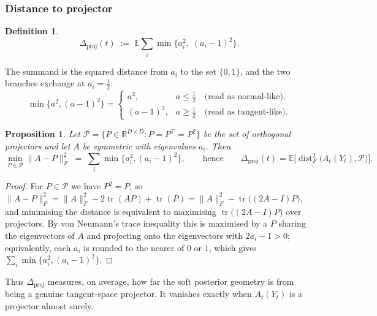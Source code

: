 \documentclass{article}
\DeclareMathOperator{\tr}{tr}
\DeclareMathOperator{\dist}{dist}
\newcommand{\E}{\mathbb{E}}
\newcommand{\R}{\mathbb{R}}
\newcommand{\Pset}{\mathcal{P}}
\newcommand{\dproj}{\Delta_{\mathrm{proj}}}
\newcommand{\Frob}[1]{\lVert #1 \rVert_F}
\theoremstyle{plain}
\newtheorem{proposition}[theorem]{Proposition}
\theoremstyle{definition}
\newtheorem{definition}[theorem]{Definition}
\theoremstyle{remark}
\begin{document}
\subsubsection{Distance to projector}

\begin{definition}
\begin{equation}
\dproj(t) \;:=\; \E\sum_i \min\bigl\{a_i^2,\;(a_i-1)^2\bigr\}.
\label{eq:dproj}
\end{equation}
\end{definition}

The summand is the squared distance from $a_i$ to the set $\{0,1\}$, and
the two branches exchange at $a_i = \tfrac12$:
\begin{equation}
\min\{a^2,(a-1)^2\} =
\begin{cases}
a^2, & a \le \tfrac12 \quad\text{(read as normal-like)},\\
(a-1)^2, & a \ge \tfrac12 \quad\text{(read as tangent-like)}.
\end{cases}
\end{equation}

\begin{proposition}
\label{prop:dproj-frob}
Let $\Pset = \{P \in \R^{D\times D}: P = P^\top = P^2\}$ be the set of
orthogonal projectors and let $A$ be symmetric with eigenvalues $a_i$.
Then
\begin{equation}
\min_{P\in\Pset}\Frob{A-P}^2 \;=\; \sum_i \min\{a_i^2,(a_i-1)^2\},
\qquad\text{hence}\qquad
\dproj(t) = \E\bigl[\dist_F^2\bigl(A_t(Y_t),\Pset\bigr)\bigr].
\label{eq:dproj-frob}
\end{equation}

\end{proposition}

\begin{proof}
For $P\in\Pset$ we have $P^2=P$, so
$\Frob{A-P}^2 = \Frob{A}^2 - 2\tr(AP) + \tr(P) = \Frob{A}^2 - \tr\bigl((2A-I)P\bigr)$,
and minimising the distance is equivalent to maximising $\tr\bigl((2A-I)P\bigr)$
over projectors. By von Neumann's trace inequality this is maximised by a $P$
sharing the eigenvectors of $A$ and projecting onto the eigenvectors with
$2a_i-1>0$; equivalently, each $a_i$ is rounded to the nearer of $0$ or $1$,
which gives $\sum_i \min\{a_i^2,(a_i-1)^2\}$.
\end{proof}

Thus $\dproj$ measures, on average, how far the soft posterior geometry is from being a genuine tangent-space projector. It vanishes
exactly when $A_t(Y_t)$ is a projector almost surely.
\end{document}
